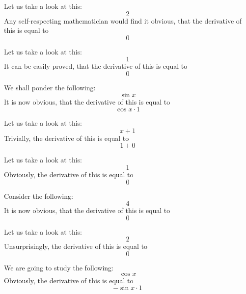 \documentclass{article}
\begin{document}
Let us take a look at this:
\begin{equation}
2 
\end{equation}
Any self-respecting mathematician would find it obvious, that the derivative of this is equal to
\begin{equation}
0 
\end{equation}

Let us take a look at this:
\begin{equation}
1 
\end{equation}
It can be easily proved, that the derivative of this is equal to
\begin{equation}
0 
\end{equation}

We shall ponder the following:
\begin{equation}
\sin x 
\end{equation}
It is now obvious, that the derivative of this is equal to
\begin{equation}
\cos x \cdot 1 
\end{equation}

Let us take a look at this:
\begin{equation}
x + 1 
\end{equation}
Trivially, the derivative of this is equal to
\begin{equation}
1 + 0 
\end{equation}

Let us take a look at this:
\begin{equation}
1 
\end{equation}
Obviously, the derivative of this is equal to
\begin{equation}
0 
\end{equation}

Consider the following:
\begin{equation}
4 
\end{equation}
It is now obvious, that the derivative of this is equal to
\begin{equation}
0 
\end{equation}

Let us take a look at this:
\begin{equation}
2 
\end{equation}
Unsurprisingly, the derivative of this is equal to
\begin{equation}
0 
\end{equation}

We are going to study the following:
\begin{equation}
\cos x 
\end{equation}
Obviously, the derivative of this is equal to
\begin{equation}
-\sin x \cdot 1 
\end{equation}
\end{document}
